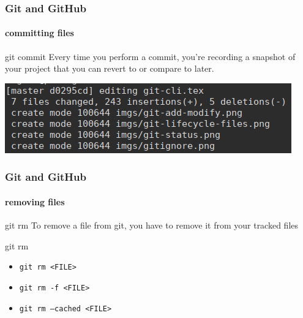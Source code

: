 \begin{frame}
	\frametitle{Git and GitHub}
    \framesubtitle{committing files}
    \addtocounter{nframe}{1}

	\begin{block}{git commit}
		Every time you perform a commit, you’re recording a snapshot of your project that you can revert to or compare to later.
	\end{block}

	\begin{center}
		\includegraphics[width=.8\textwidth]{imgs/git-commit.png}
	\end{center}

\end{frame}

\begin{frame}
	\frametitle{Git and GitHub}
    \framesubtitle{removing files}
    \addtocounter{nframe}{1}

	\begin{block}{git rm}
		To remove a file from git, you have to remove it from your tracked files
	\end{block}

	\begin{block}{git rm}
		\begin{itemize}
			\item \texttt{git rm <FILE>}
			\item \texttt{git rm -f <FILE>}
			\item \texttt{git rm --cached <FILE>}
		\end{itemize}
	
	\end{block}

\end{frame}

